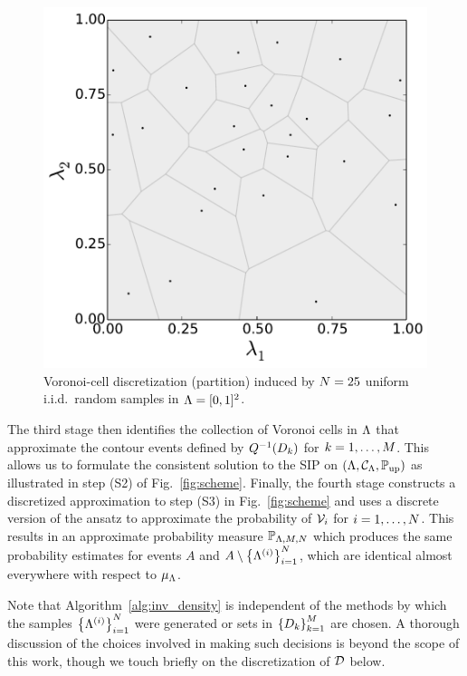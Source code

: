 \begin{figure}[ht]
\centering
	\begin{minipage}{.475\textwidth}
		\includegraphics[width=\linewidth]{./images/voronoi_diagram_N25_r0}
	\end{minipage}
\caption{
Voronoi-cell discretization (partition) induced by $N = 25 $ uniform i.i.d.~random samples in ${\Lambda} = [0,1]^2$.
}
\label{fig:voronoi_cells}
\end{figure}

The third stage then identifies the collection of Voronoi cells in ${\Lambda}$ that approximate the contour events defined by $Q^{-1}(D_k)$ for $k=1,\hdots,M$. This allows us to formulate the consistent solution to the SIP on $({\Lambda}, \mathcal{C}_{{\Lambda}}, \operatorname*{\mathbb{P}_{up}})$ as illustrated in step (S2) of Fig.~\ref{fig:scheme}.
Finally, the fourth stage constructs a discretized approximation to step (S3) in Fig.~\ref{fig:scheme} and uses a discrete version of the ansatz to approximate the probability of $\mathcal{V}_i$ for $i=1,\dots,N$.
This results in an approximate probability measure $\mathbb{P}_{{\Lambda}, M, N}$ which produces the same probability estimates for events $A$ and $A\setminus \left\{ {\Lambda}^{(i)} \right\}_{i=1}^N$, which are identical almost everywhere with respect to $\mu_{{\Lambda}}$.

Note that Algorithm~\ref{alg:inv_density} is independent of the methods by which the samples $\left\{ {\Lambda}^{(i)} \right\}_{i=1}^{N}$ were generated or sets in $\left\{D_k\right\}_{k=1}^{M}$ are chosen.
A thorough discussion of the choices involved in making such decisions is beyond the scope of this work, though we touch briefly on the discretization of $\mathcal{D}$ below.
